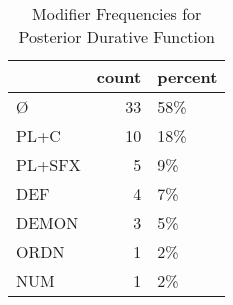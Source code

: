 \begin{table}[htbp!]
\centering
\caption{Modifier Frequencies for Posterior Durative Function}
\label{table:postdur_mod_cp}
\begin{tabular}{lrl}
\toprule
{} &  count & percent \\
\midrule
Ø      &     33 &     58\% \\
PL+C   &     10 &     18\% \\
PL+SFX &      5 &      9\% \\
DEF    &      4 &      7\% \\
DEMON  &      3 &      5\% \\
ORDN   &      1 &      2\% \\
NUM    &      1 &      2\% \\
\bottomrule
\end{tabular}
\end{table}
